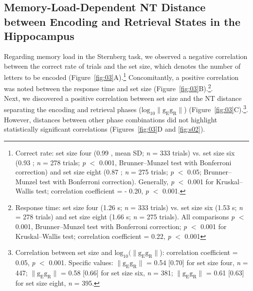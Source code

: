 \documentclass[preprint,review,12pt]{elsarticle}%
\providecommand{\DIFaddend}{} %
\DeclareRobustCommand{\DIFaddend}{\DIFOaddend \let\includegraphics\DIFOincludegraphics} %
\begin{document}
\DIFaddend \subsection{Memory-Load-Dependent NT Distance between Encoding and Retrieval States in the Hippocampus}
Regarding memory load in the Sternberg task, we observed a negative correlation between the correct rate of trials and the set size, which denotes the number of letters to be encoded (Figure~\ref{fig:03}A).\footnote{Correct rate: set size four (0.99 , mean \textpm SD; \textit{n} = 333 trials) vs. set size six (0.93 ; \textit{n} = 278 trials; \textit{p} $<$ 0.001, Brunner--Munzel test with Bonferroni correction) and set size eight (0.87 ; \textit{n} = 275 trials; \textit{p} $<$ 0.05; Brunner--Munzel test with Bonferroni correction). Generally, \textit{p} $<$ 0.001 for Kruskal--Wallis test; correlation coefficient = - 0.20, \textit{p} $<$ 0.001.} Concomitantly, a positive correlation was noted between the response time and set size (Figure~\ref{fig:03}B).\footnote{Response time: set size four (1.26  s; \textit{n} = 333 trials) vs. set size six (1.53  s; \textit{n} = 278 trials) and set size eight (1.66  s; \textit{n} = 275 trials). All comparisons \textit{p} $<$ 0.001, Brunner--Munzel test with Bonferroni correction; \textit{p} $<$ 0.001 for Kruskal--Wallis test; correlation coefficient = 0.22, \textit{p} $<$ 0.001}.
\\
\indent
Next, we discovered a positive correlation between set size and the NT distance separating the encoding and retrieval phases ($\mathrm{log_{10}\lVert g_{E}g_{R} \rVert}$) (Figure~\ref{fig:03}C).\footnote{Correlation between set size and $\mathrm{log_{10}(\lVert g_{E}g_{R} \rVert}$): correlation coefficient = 0.05, \textit{p} $<$ 0.001. Specific values: $\mathrm{\lVert g_{E}g_{R} \rVert}$ = 0.54 [0.70] for set size four, \textit{n} = 447; $\mathrm{\lVert g_{E}g_{R} \rVert}$ = 0.58 [0.66] for set size six, \textit{n} = 381; $\mathrm{\lVert g_{E}g_{R} \rVert}$ = 0.61 [0.63] for set size eight, \textit{n} = 395.}. However, distances between other phase combinations did not highlight statistically significant correlations (Figures~\ref{fig:03}D and \ref{fig:s02}).
\end{document}
